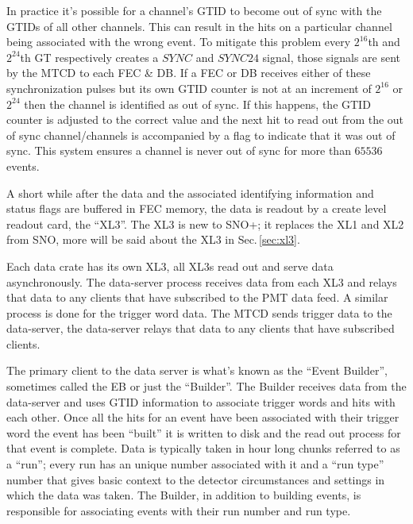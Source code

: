 In practice it's possible for a channel's GTID to become out of sync with the GTIDs of
all other channels.
This can result in the hits on a particular channel being associated with
the wrong event.
To mitigate this problem every $2^{16}$th and $2^{24}$th GT respectively creates a $SYNC$ and
$SYNC24$ signal, those signals are sent by the MTCD to each FEC \& DB\@.
If a FEC or DB receives either of these synchronization pulses but its own GTID counter is not
at an increment of $2^{16}$ or $2^{24}$ then the channel is identified as out of sync.
If this happens, the GTID counter is adjusted to the correct value and the next hit to read out from the out of sync channel/channels is accompanied
by a flag to indicate that it was out of sync.
This system ensures a channel is never out of sync for more than $65536$ events.

A short while after the data and the associated identifying information and status flags are buffered
in FEC memory, the data is readout by a create level readout card,
the ``XL3''.
The XL3 is new to SNO+; it replaces the XL1 and XL2 from SNO, more will be said about the
XL3 in Sec.\,\ref{sec:xl3}.

Each data crate has its own XL3, all XL3s read out and serve data asynchronously.
The data-server process receives data from each XL3 and relays that data to
any clients that have subscribed to the PMT data feed.
A similar process is done for the trigger word data. The MTCD sends trigger data
to the data-server, the data-server relays that data to any clients that have subscribed
clients.

The primary client to the data server is what's known as the ``Event Builder'', sometimes
called the EB or just the ``Builder''. The Builder receives data from the data-server and
uses GTID information to associate trigger words and hits with each other.
Once all the hits for an event have been associated with their trigger word the event
has been ``built'' it is written to disk and the read out process for that event is complete.
Data is typically taken in hour long chunks referred to as a ``run'';
every run has an unique number associated with it and a ``run type'' number that
gives basic context to the detector circumstances and settings in which the data was taken.
The Builder, in addition to building events, is responsible for associating
events with their run number and run type.

